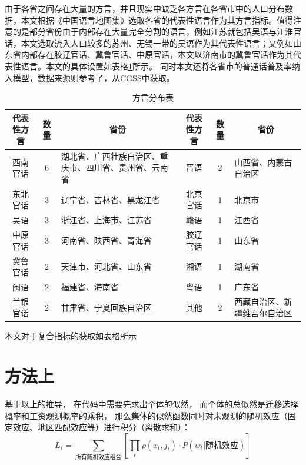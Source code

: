 \documentclass[
  a4paper,
  zihao=-4,
  fontset=mac,
  AutoFakeBold,
  AutoFakeSlant,
  oneside]{ctexbook}
\begin{document}
由于各省之间存在大量的方言，并且现实中缺乏各方言在各省市中的人口分布数据，本文根据《中国语言地图集》选取各省的代表性语言作为其方言指标。值得注意的是部分省份由于内部存在大量完全分割的语言，例如江苏就包括吴语与江淮官话，本文选取流入人口较多的苏州、无锡一带的吴语作为其代表性语言；又例如山东省内部存在胶辽官话、冀鲁官话、中原官话，本文以济南市的冀鲁官话作为其代表性语言。本文的具体设置如表格\ref{tab:方言分布表}所示。
同时本文还将各省市的普通话普及率纳入模型，数据来源则参考了\textcite{YuWeiQiGuoMinPuTongHuaNengLiDeJiBenZhuangKuangYuFaZhanTaiShi2018}，从CGSS中获取。




\begin{table}[!ht]
\centering
\caption{方言分布表}
\begin{tabularx}{\textwidth}{@{}ccXccX@{}}
\toprule
\textbf{代表性方言} & \textbf{数量} & \multicolumn{1}{c}{\textbf{省份}} & \textbf{代表性方言} &\textbf{数量}  & \multicolumn{1}{c}{\textbf{省份}}\\
\midrule
西南官话 & 6 & 湖北省、广西壮族自治区、重庆市、四川省、贵州省、云南省 &晋语 & 2 &山西省、内蒙古自治区\\
东北官话 & 3 &辽宁省、吉林省、黑龙江省 & 北京官话  &1 &北京市\\
吴语 & 3 &浙江省、上海市、江苏省& 赣语  &1 &江西省\\
中原官话 & 3 &河南省、陕西省、青海省 &胶辽官话  &1& 山东省\\
冀鲁官话 & 2 &天津市、河北省、山东省 &湘语  &1 &湖南省\\
闽语 & 2 &福建省、海南省 &粤语  &1& 广东省\\
兰银官话 & 2 &甘肃省、宁夏回族自治区 &其他  &2& 西藏自治区、新疆维吾尔自治区\\
\bottomrule
\end{tabularx}
\label{tab:方言分布表}
\end{table}


本文对于复合指标的获取如表格所示

\section{方法上} %
\label{sub:方法上}

基于以上的推导，
在代码中需要先求出个体的似然，
而个体的总似然是迁移选择概率和工资观测概率的乘积，
那么集体的似然函数同时对未观测的随机效应（固定效应、地区匹配效应等）进行积分（离散求和）：
\begin{equation}
  L_{i}=\sum\limits_{\text{所有随机效应组合}}[\prod_{t}\rho(x_{t},j_{t})\cdot P(w_{t}|\text{随机效应}) ]
\end{equation}
\end{document}
